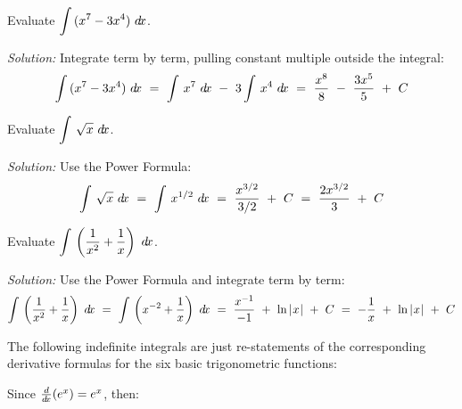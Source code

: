 \begin{exmp}\label{antideriv4}
\noindent Evaluate $\displaystyle\int\,(x^7 - 3x^4)~d\!x$.\vspace{1mm}
\par\noindent\emph{Solution:} Integrate term by term, pulling constant multiple
outside the integral:
\[
\int\,(x^7 - 3x^4)~d\!x ~=~
\int\,x^7~d\!x ~-~ 3\int\,x^4~d\!x ~=~
\frac{x^8}{8} ~-~ \frac{3x^5}{5} ~+~ C
\]
\end{exmp}
\divider
\newpage
\begin{exmp}\label{antideriv5}
\noindent Evaluate $\displaystyle\int\,\sqrt{x}~d\!x$.\vspace{1mm}
\par\noindent\emph{Solution:} Use the Power Formula:
\[
\int\,\sqrt{x}~d\!x ~=~
\int\,x^{1/2}~d\!x ~=~
\frac{x^{3/2}}{3/2} ~+~ C ~=~ \frac{2x^{3/2}}{3} ~+~ C
\]
\end{exmp}
\begin{exmp}\label{antideriv6}
\noindent Evaluate $\displaystyle\int\,\left(\dfrac{1}{x^2} + \dfrac{1}{x}\right)~d\!x$.\vspace{1mm}
\par\noindent\emph{Solution:} Use the Power Formula and integrate term by term:
\[
\int\,\left(\frac{1}{x^2} + \frac{1}{x}\right)~d\!x ~=~
\int\,\left(x^{-2} + \frac{1}{x}\right)~d\!x ~=~
\frac{x^{-1}}{-1} ~+~ \ln\,\lvert\mspace{1mu}x\mspace{1mu}\rvert ~+~ C ~=~
-\frac{1}{x} ~+~ \ln\,\lvert\mspace{1mu}x\mspace{1mu}\rvert ~+~ C
\]
\end{exmp}
\divider
\vspace{3mm}

The following indefinite integrals are just re-statements of the corresponding
derivative formulas for the six basic trigonometric functions:


Since $\frac{d}{d\!x}(e^x) = e^x$, then:

